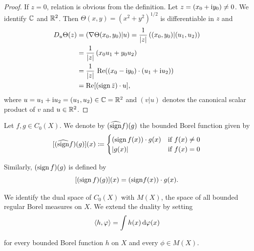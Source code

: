 \begin{proof}
If\/ $z = 0$, relation  is obvious from the definition.
Let $z = (x_{0} + \mathrm{i} y_{0}) \neq 0$.
We identify $\mathbb{C}$ and $\mathbb{R}^2$.
Then $\Theta(x,y) = (x^2 + y^2)^{1/2}$ is differentiable in $z$ and
\begin{align*}
D_{u}\Theta(z) &= (\nabla\Theta(x_{0},y_{0})|u) = \frac{1}{|z|}\, ((x_{0},y_{0})|(u_{1},u_{2}))  \\
               &= \frac{1}{|z|}\, (x_{0}u_{1} + y_{0}u_{2}) \\
               &= \frac{1}{|z|}\, \mathop{}\!\mathrm{Re}((x_{0}-\mathrm{i} y_{0})\cdot(u_{1}+\mathrm{i} u_{2})) \\
               &= \mathop{}\!\mathrm{Re}[(\operatorname{sign} \bar{z})\cdot u],
\end{align*}
where $u = u_{1} + \mathrm{i} u_{2} = (u_{1},u_{2}) \in \mathbb{C} = \mathbb{R}^2$ and $(v|u)$ denotes the canonical scalar product of\/ 
$v$ and $u \in \mathbb{R}^2$.
\end{proof}
Let $f, g \in C_{0}(X)$.
We denote by $(\widehat{\operatorname{sign}} f)(g)$ the bounded Borel function given by
\begin{equation}\label{eq:b2-2.7}
[(\widehat{\operatorname{sign}} f)(g)](x) \coloneq \begin{cases}
    (\operatorname{sign} f(x))\cdot g(x) & \text{if } f(x) \neq 0 \\
    |g(x)| & \text{if } f(x) = 0
\end{cases}
\end{equation}

Similarly, $(\operatorname{sign} f)(g)$ is defined by
\begin{equation}\label{eq:b2-2.8}
[(\operatorname{sign} f)(g)](x) = ({\operatorname{sign}} f(x))\cdot g(x).
\end{equation}

We identify the dual space of\/ $C_{0}(X)$ with $M(X)$, the space of all bounded regular Borel measures on $X$.
We extend the duality by setting
\begin{equation*}
\langle h,\phi \rangle = \int h(x)   \diff\phi(x)
\end{equation*}

for every bounded Borel function $h$ on $X$ and every $\phi \in M(X)$.

